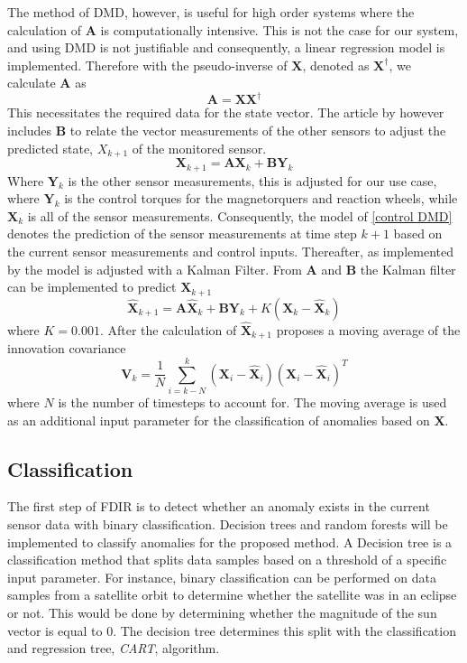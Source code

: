 \documentclass[letterpaper, 10 pt, conference]{ieeeconf}  %
\begin{document}
The method of DMD, however, is useful for high order systems where the calculation of $\mathbf{A}$ is computationally intensive. This is not the case for our system, and using DMD is not justifiable and consequently, a linear regression model is implemented. Therefore with the pseudo-inverse of $\mathbf{X}$, denoted as $\mathbf{X^{\dagger}}$, we calculate $\mathbf{A}$ as
\begin{equation}
\mathbf{A} = \mathbf{X}\mathbf{X^{\dagger}}
\end{equation}
This necessitates the required data for the state vector. The article by \textcite{DeSilva2020} however includes $\mathbf{B}$ to relate the vector measurements of the other sensors to adjust the predicted state, $X_{k+1}$ of the monitored sensor. 
\begin{equation}
\mathbf{X}_{k+1} = \mathbf{AX}_k + \mathbf{BY}_k
\label{control DMD}
\end{equation}
Where $\mathbf{Y}_k$ is the other sensor measurements, this is adjusted for our use case, where $\mathbf{Y}_k$ is the control torques for the magnetorquers and reaction wheels, while $\mathbf{X}_k$ is all of the sensor measurements. Consequently, the model of \ref{control DMD} denotes the prediction of the sensor measurements at time step $k+1$ based on the current sensor measurements and control inputs.
Thereafter, as implemented by \textcite{DeSilva2020} the model is adjusted with a Kalman Filter. From $\mathbf{A}$ and $\mathbf{B}$ the Kalman filter can be implemented to predict $\mathbf{X}_{k+1}$
\begin{equation}
\hat{\mathbf{X}}_{k+1} = \mathbf{A}\hat{\mathbf{X}}_k + \mathbf{B}\mathbf{Y}_k + K(\mathbf{X}_k - \hat{\mathbf{X}}_k)
\end{equation}
where $K = 0.001$. After the calculation of $\hat{\mathbf{X}}_{k+1}$ \textcite{DeSilva2020} proposes a moving average of the innovation covariance
\begin{equation}
\mathbf{V}_k = \frac{1}{N} \sum_{i=k-N}^k (\mathbf{X}_i - \hat{\mathbf{X}}_i)(\mathbf{X}_i - \hat{\mathbf{X}}_i)^T
\end{equation}
where $N$ is the number of timesteps to account for. The moving average is used as an additional input parameter for the classification of anomalies based on $\mathbf{X}$.

\subsection{Classification}
The first step of FDIR is to detect whether an anomaly exists in the current sensor data with binary classification. Decision trees and random forests will be implemented to classify anomalies for the proposed method. A Decision tree is a classification method that splits data samples based on a threshold of a specific input parameter. For instance, binary classification can be performed on data samples from a satellite orbit to determine whether the satellite was in an eclipse or not. This would be done by determining whether the magnitude of the sun vector is equal to $0$. The decision tree determines this split with the classification and regression tree, \emph{CART}, algorithm.
\end{document}
